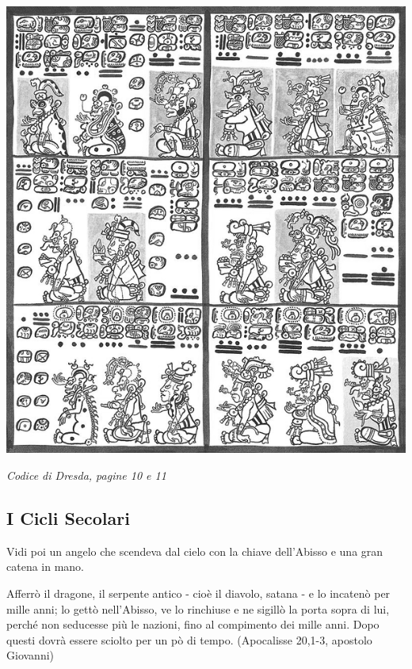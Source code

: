 \vfill

\begin{center}
\includegraphics[width=0.5\linewidth]{immagini/Laminas_8_y_9_del_Codice_de_Dresden2.png}

\medskip

\emph{Codice di Dresda, pagine 10 e 11}
\end{center}

\pagebreak

\subsection{I Cicli Secolari}

\begin{enfasi}{
Vidi poi un angelo che scendeva dal cielo con la chiave dell'Abisso e una gran catena in mano.

Afferrò il dragone, il serpente antico - cioè il diavolo, satana - e lo incatenò per mille anni; lo gettò nell'Abisso, ve lo rinchiuse e ne sigillò la porta sopra di lui, perché non seducesse più le nazioni, fino al compimento dei mille anni. Dopo questi dovrà essere sciolto per un pò di tempo. (Apocalisse 20,1-3, apostolo Giovanni)
}\end{enfasi}


